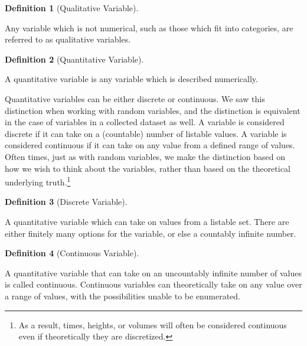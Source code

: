 \documentclass[
  letterpaper,
  DIV=11,
  numbers=noendperiod]{scrreprt}
\theoremstyle{definition}
\theoremstyle{definition}
\theoremstyle{definition}
\newtheorem{definition}{Definition}[chapter]
\theoremstyle{remark}
\begin{document}
\begin{definition}[Qualitative
Variable]\protect\hypertarget{def-qualitative-variable}{}\label{def-qualitative-variable}

Any variable which is not numerical, such as those which fit into
categories, are referred to as qualitative variables.

\end{definition}

\begin{definition}[Quantitative
Variable]\protect\hypertarget{def-quantitative-variable}{}\label{def-quantitative-variable}

A quantitative variable is any variable which is described numerically.

\end{definition}

Quantitative variables can be either discrete or continuous. We saw this
distinction when working with random variables, and the distinction is
equivalent in the case of variables in a collected dataset as well. A
variable is considered discrete if it can take on a (countable) number
of listable values. A variable is considered continuous if it can take
on any value from a defined range of values. Often times, just as with
random variables, we make the distinction based on how we wish to think
about the variables, rather than based on the theoretical underlying
truth.\footnote{As a result, times, heights, or volumes will often be
  considered continuous even if theoretically they are discretized.}

\begin{definition}[Discrete
Variable]\protect\hypertarget{def-discrete-var}{}\label{def-discrete-var}

A quantitative variable which can take on values from a listable set.
There are either finitely many options for the variable, or else a
countably infinite number.

\end{definition}

\begin{definition}[Continuous
Variable]\protect\hypertarget{def-continuous-var}{}\label{def-continuous-var}

A quantitative variable that can take on an uncountably infinite number
of values is called continuous. Continuous variables can theoretically
take on any value over a range of values, with the possibilities unable
to be enumerated.

\end{definition}
\end{document}
